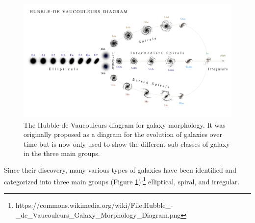 \documentclass[12pt, oneside]{smuthesis}
\begin{document}
\begin{figure}
	\centering
	\includegraphics[width=\linewidth]{GalaxyClassificationChart}
	\caption{The Hubble-de Vaucouleurs diagram for galaxy morphology. It was originally proposed as a diagram for the evolution of galaxies over time but is now only used to show the different sub-classes of galaxy in the three main groups.}
	\label{fig:classDiagram}
\end{figure}

Since their discovery, many various types of galaxies have been identified and categorized into three main groups (Figure \ref{fig:classDiagram}):\footnote{https://commons.wikimedia.org/wiki/File:Hubble\_-\_de\_Vaucouleurs\_Galaxy\_Morphology\_Diagram.png} elliptical, spiral, and irregular.
\end{document}

